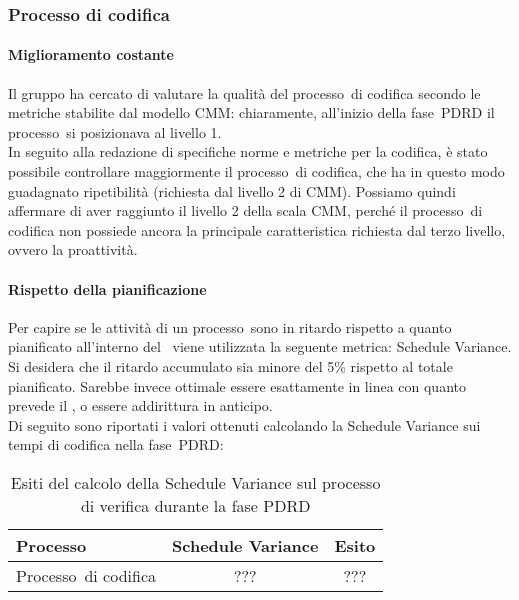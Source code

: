 \documentclass[../PianoDiQualifica.tex]{subfiles}
\begin{document}
\begin{appendices}
		\subsubsection{Processo di codifica}
			\paragraph{Miglioramento costante}
			Il gruppo ha cercato di valutare la qualità del processo\g\ di codifica secondo le metriche stabilite dal modello CMM\g: chiaramente, all'inizio della fase\g\ PDRD il processo\g\ si posizionava al livello 1.\\
			In seguito alla redazione di specifiche norme e metriche per la codifica, è stato possibile controllare maggiormente il processo\g\ di codifica, che ha in questo modo guadagnato ripetibilità (richiesta dal livello 2 di CMM\g).
			Possiamo quindi affermare di aver raggiunto il livello 2 della scala CMM\g, perché il processo\g\ di codifica non possiede ancora la principale caratteristica richiesta dal terzo livello, ovvero la proattività.\\
			
			\paragraph{Rispetto della pianificazione}
			Per capire se le attività di un processo\g\ sono in ritardo rispetto a quanto pianificato all'interno del \pianodiprogetto\ viene utilizzata la seguente metrica: Schedule Variance.\\
			Si desidera che il ritardo accumulato sia minore del 5\% rispetto al totale pianificato. Sarebbe invece ottimale essere esattamente in linea con quanto prevede il \pianodiprogetto, o essere addirittura in anticipo.\\
			Di seguito sono riportati i valori ottenuti calcolando la Schedule Variance sui tempi di codifica nella fase\g\ PDRD:
			
			\begin{table}[H]
				\centering
				\begin{tabular}{l * {2}{c}}
					\toprule
					\textbf{Processo} & \textbf{Schedule Variance} & \textbf{Esito} \\
					\midrule
					Processo\g\ di codifica & ??? &  ??? \\
					\bottomrule
				\end{tabular}
				\caption{Esiti del calcolo della Schedule Variance sul processo di verifica durante la fase PDRD}
				\label{tab:esiti_schedule_variance}
			\end{table}
			

\end{appendices}
\end{document}
